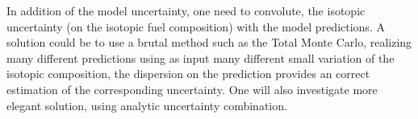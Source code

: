 \documentclass[dvips,12pt]{article}
\begin{document}
In addition of the model uncertainty, one need to convolute, the isotopic uncertainty (on the isotopic fuel composition) with the model predictions. 
A solution could be to use a brutal method such as the Total Monte Carlo, realizing many different predictions using as input many different  small variation of the isotopic composition, the dispersion on the prediction provides an correct estimation of the corresponding uncertainty. One will also investigate more elegant solution, using analytic uncertainty combination.




  
\end{document}
